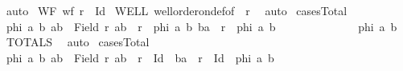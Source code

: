 \begin{isabellebody}
\ auto%
\endisatagproof
{\isafoldproof}%
%
\isadelimproof
\isanewline
%
\endisadelimproof
\isanewline
{}\isamarkupfalse%
\ WF{\isacharcolon}{\kern0pt}\ {\isachardoublequoteopen}wf\ {\isacharparenleft}{\kern0pt}r\ {\isacharminus}{\kern0pt}\ Id{\isacharparenright}{\kern0pt}{\isachardoublequoteclose}\isanewline
%
\isadelimproof
%
\endisadelimproof
%
\isatagproof
{}\isamarkupfalse%
\ WELL\ well{\isacharunderscore}{\kern0pt}order{\isacharunderscore}{\kern0pt}on{\isacharunderscore}{\kern0pt}def{\isacharbrackleft}{\kern0pt}of\ {\isacharunderscore}{\kern0pt}\ r{\isacharbrackright}{\kern0pt}\ \isamarkupfalse%
\ auto%
\endisatagproof
{\isafoldproof}%
%
\isadelimproof
\isanewline
%
\endisadelimproof
\isanewline
{}\isamarkupfalse%
\ cases{\isacharunderscore}{\kern0pt}Total{\isacharcolon}{\kern0pt}\isanewline
{\isachardoublequoteopen}{\isasymAnd}\ phi\ a\ b{\isachardot}{\kern0pt}\ {\isasymlbrakk}{\isacharbraceleft}{\kern0pt}a{\isacharcomma}{\kern0pt}b{\isacharbraceright}{\kern0pt}\ {\isacharless}{\kern0pt}{\isacharequal}{\kern0pt}\ Field\ r{\isacharsemicolon}{\kern0pt}\ {\isacharparenleft}{\kern0pt}{\isacharparenleft}{\kern0pt}a{\isacharcomma}{\kern0pt}b{\isacharparenright}{\kern0pt}\ {\isasymin}\ r\ {\isasymLongrightarrow}\ phi\ a\ b{\isacharparenright}{\kern0pt}{\isacharsemicolon}{\kern0pt}\ {\isacharparenleft}{\kern0pt}{\isacharparenleft}{\kern0pt}b{\isacharcomma}{\kern0pt}a{\isacharparenright}{\kern0pt}\ {\isasymin}\ r\ {\isasymLongrightarrow}\ phi\ a\ b{\isacharparenright}{\kern0pt}{\isasymrbrakk}\isanewline
\ \ \ \ \ \ \ \ \ \ \ \ \ {\isasymLongrightarrow}\ phi\ a\ b{\isachardoublequoteclose}\isanewline
%
\isadelimproof
%
\endisadelimproof
%
\isatagproof
{}\isamarkupfalse%
\ TOTALS\ \isamarkupfalse%
\ auto%
\endisatagproof
{\isafoldproof}%
%
\isadelimproof
\isanewline
%
\endisadelimproof
\isanewline
{}\isamarkupfalse%
\ cases{\isacharunderscore}{\kern0pt}Total{}{\isacharcolon}{\kern0pt}\isanewline
{\isachardoublequoteopen}{\isasymAnd}\ phi\ a\ b{\isachardot}{\kern0pt}\ {\isasymlbrakk}{\isacharbraceleft}{\kern0pt}a{\isacharcomma}{\kern0pt}b{\isacharbraceright}{\kern0pt}\ {\isasymle}\ Field\ r{\isacharsemicolon}{\kern0pt}\ {\isacharparenleft}{\kern0pt}{\isacharparenleft}{\kern0pt}a{\isacharcomma}{\kern0pt}b{\isacharparenright}{\kern0pt}\ {\isasymin}\ r\ {\isacharminus}{\kern0pt}\ Id\ {\isasymor}\ {\isacharparenleft}{\kern0pt}b{\isacharcomma}{\kern0pt}a{\isacharparenright}{\kern0pt}\ {\isasymin}\ r\ {\isacharminus}{\kern0pt}\ Id\ {\isasymLongrightarrow}\ phi\ a\ b{\isacharparenright}{\kern0pt}{\isacharsemicolon}{\kern0pt}\isanewline

\end{isabellebody}
